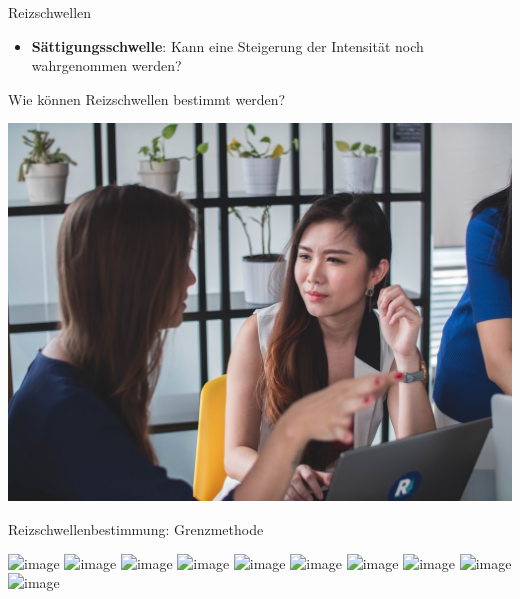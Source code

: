 \documentclass{beamer}
\begin{document}
\begin{frame}{Reizschwellen}
\begin{itemize}
\begin{columns}[c]
\begin{column}{3cm}
    \end{column}
    
\end{columns}

$\,$\\

\pause
    \item
\textbf{Sättigungsschwelle}: Kann eine Steigerung der Intensität noch wahrgenommen werden?
\end{itemize}
    
    
\end{frame}


\begin{frame}{Wie können Reizschwellen bestimmt werden?}

\begin{center}
    \includegraphics[width=\textwidth]{zweiergespraech.jpg}
\end{center}

    
\end{frame}



\begin{frame}{Reizschwellenbestimmung: Grenzmethode}


\begin{center}
\includegraphics<1>[width=0.4\textwidth]{reizschwelle_seriell_1.png}
\includegraphics<2>[width=0.4\textwidth]{reizschwelle_seriell_2.png}
\includegraphics<3>[width=0.4\textwidth]{reizschwelle_seriell_3.png}
\includegraphics<4>[width=0.4\textwidth]{reizschwelle_seriell_4.png}
\includegraphics<5>[width=0.4\textwidth]{reizschwelle_seriell_5.png}
\includegraphics<6>[width=0.4\textwidth]{reizschwelle_seriell_6.png}
\includegraphics<7>[width=0.4\textwidth]{reizschwelle_seriell_7.png}
\includegraphics<8>[width=0.4\textwidth]{reizschwelle_seriell_8.png}
\includegraphics<9>[width=0.4\textwidth]{reizschwelle_seriell_9.png}
\includegraphics<10>[width=0.4\textwidth]{reizschwelle_seriell_10.png}
\end{center}

    
\end{frame}
\end{document}
